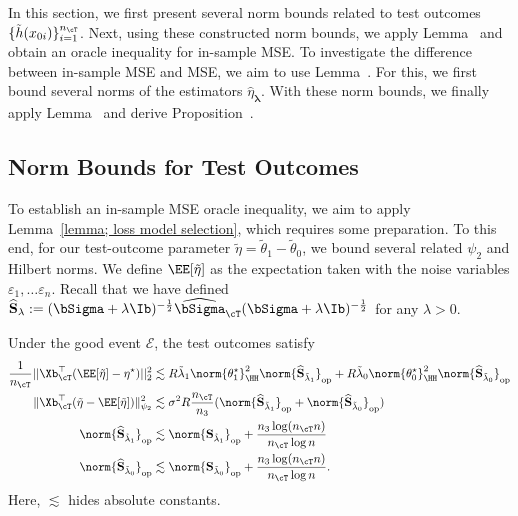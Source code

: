 \documentclass[12pt,a4paper,pdftex,onepage]{article}
\newcommand{\Sighat}{\widehat{{\bSigma}}}
\newcommand{\op}{\operatorname{op}}
\newcommand{\sig}{\sigma}
\newcommand{\Sbar}{\mathbf{S}}
\newcommand{\Shat}{\widehat{\mathbf{S}}}
\newcommand{\event}{\mathscr{E}}
\begin{document}
In this section, we first present several norm bounds related to test outcomes $\{\tilde{h}(x_{0i})\}_{i=1}^{n_{\cT}}$. 
Next, using these constructed norm bounds, we apply Lemma~ and obtain an oracle inequality for in-sample MSE.
To investigate the difference between in-sample MSE and MSE, we aim to use Lemma~. 
For this, we first bound several norms of the estimators $\hat{\eta}_{\bm{\lambda}}$. 
With these norm bounds, we finally apply Lemma~ and derive Proposition~. 



\subsection{Norm Bounds for Test Outcomes}
To establish an in-sample MSE oracle inequality, we aim to apply Lemma~\ref{lemma; loss model selection}, which requires some preparation. To this end, for our test-outcome parameter \(\tilde{\eta} = \tilde{\theta}_1 - \tilde{\theta}_0\), we bound several related \(\psi_2\) and Hilbert norms.
We define \(\EE[\tilde{\eta}]\) as the expectation taken with the noise variables $\varepsilon_1, \dots \varepsilon_n$.
Recall that we have defined $\Shat_\lambda := (\bSigma + \lambda \Ib)^{-\frac{1}{2}} \Sighat_{\cT} (\bSigma + \lambda \Ib)^{-\frac{1}{2}}$ for any \(\lambda >0\).

\begin{lemma}\label{lemma; test outcome norm preparation}
Under the good event $\event$, the test outcomes satisfy 
\begin{align*}
\frac{1}{n_\cT} ||\Xb_\cT^\top (\EE[\tilde{\eta}] -\eta^\star) ||^2_2 &\lesssim 
R\tilde{\lambda}_1 \norm{\theta_1^\star}_{\HH}^2 \norm{\Shat_{\tilde{\lambda}_1}}_{\op} + R  \tilde{\lambda}_0 \norm{\theta_0^\star}_{\HH}^2 \norm{\Shat_{\tilde{\lambda}_0}}_{\op}\\
\|\Xb_\cT^\top (\tilde{\eta} -\EE[\tilde{\eta}]) \|^2_{\psi_2} &\lesssim \sig^2  R\frac{n_{\cT}}{n_3}(\norm{\Shat_{\tilde{\lambda}_1}}_{\op} + \norm{\Shat_{\tilde{\lambda}_0}}_{\op})\\
\norm{\Shat_{\tilde{\lambda}_1}}_{\op} &\lesssim \norm{\Sbar_{\tilde{\lambda}_1}}_{\op} + \frac{n_3 \log (n_\cT n)}{n_{\cT} \log n}\\
\norm{\Shat_{\tilde{\lambda}_0}}_{\op} &\lesssim \norm{\Sbar_{\tilde{\lambda}_0}}_{\op} + \frac{n_3 \log (n_\cT n)}{n_{\cT} \log n}.
\end{align*}
Here, \(\lesssim\) hides absolute constants.
\end{lemma}
\end{document}
